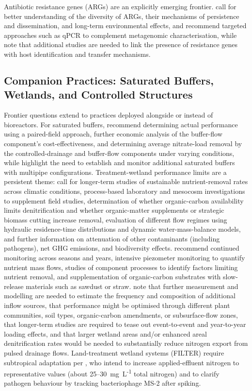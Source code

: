 Antibiotic resistance genes (ARGs) are an explicitly emerging frontier. \textcite{Smith2019b} call for better understanding of the diversity of ARGs, their mechanisms of persistence and dissemination, and long-term environmental effects, and recommend targeted approaches such as qPCR to complement metagenomic characterisation, while \textcite{Rieke2018} note that additional studies are needed to link the presence of resistance genes with host identification and transfer mechanisms.

\subsection{Companion Practices: Saturated Buffers, Wetlands, and Controlled Structures}
Frontier questions extend to practices deployed alongside or instead of bioreactors. For saturated buffers, \textcite{Ghane2025} recommend determining actual performance using a paired-field approach, further economic analysis of the buffer-flow component's cost-effectiveness, and determining average nitrate-load removal by the controlled-drainage and buffer-flow components under varying conditions, while \textcite{Jaynes2019b} highlight the need to establish and monitor additional saturated buffers with multipipe configurations. Treatment-wetland performance limits are a persistent theme: \textcite{Tanner2005} call for longer-term studies of sustainable nutrient-removal rates across climatic conditions, process-based laboratory and mesocosm investigations to supplement field studies, determination of whether organic-carbon availability limits denitrification and whether organic-matter supplements or strategic biomass cutting increase removal, evaluation of different flow regimes using hydraulic residence-time distributions and dynamic water-mass-balance models, and further information on attenuation of other contaminants (including pathogens), net GHG emissions, and biodiversity effects. \textcite{Tanner2003} recommend continued monitoring across seasons and years, intensive piezometer monitoring to quantify nutrient mass flows, studies of component processes to identify factors limiting nutrient removal, and supplementation of organic-carbon substrates with slow-release materials such as sawdust or straw. \textcite{Tanner2005b} note that further measurement and modelling are needed to estimate the frequency and composition of additional inflow sources, that performance might be optimised through different plant communities, soil types, organic-carbon amendments, or subsurface-flow zones, that longer-term studies are required to tease out event-to-event and year-to-year loading effects, and that larger wetland areas and/or enhanced areal denitrification rates would be needed to substantially reduce nitrogen export from pulsed drainage flows. Land-treatment wetland systems (FILTER) require subtropical adaptation per \textcite{Gardner2001}, who intend to increase applied-effluent nitrogen to representative values (about 25--30~mg~L\textsuperscript{-1} total nitrogen) and to clarify pathogen behaviour by tracking bacteriophage MS-2 after spiking.

